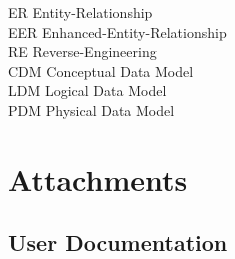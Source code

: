 \documentclass[12pt,a4paper]{report}
\begin{document}
\sloppy



\tableofcontents










\listoffigures



ER \tab Entity-Relationship \\ 
EER \tab Enhanced-Entity-Relationship \\
RE \tab Reverse-Engineering \\
CDM \tab Conceptual Data Model \\
LDM \tab Logical Data Model \\
PDM \tab Physical Data Model \\


\appendix
\chapter{Attachments}

\section{User Documentation}
\end{document}
